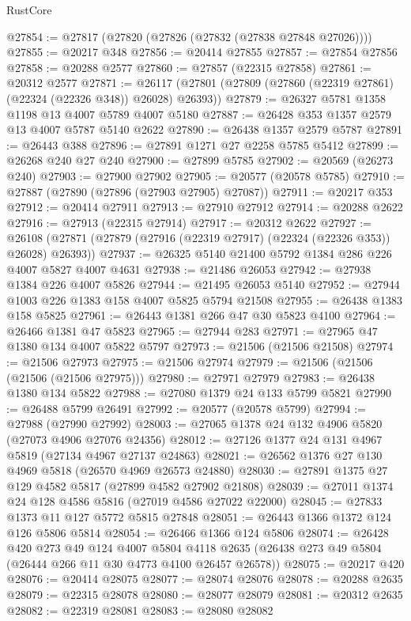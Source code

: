 \begin{lexlean}{RustCore}
\begin{coremodule}
@27854 := @27817 (@27820 (@27826 (@27832 (@27838 @27848 @27026))))
@27855 := @20217 @348
@27856 := @20414 @27855
@27857 := @27854 @27856
@27858 := @20288 @2577
@27860 := @27857 (@22315 @27858)
@27861 := @20312 @2577
@27871 := @26117 (@27801 (@27809 (@27860 (@22319 @27861) (@22324 (@22326 @348)) @26028) @26393))
@27879 := @26327 @5781 @1358 @1198 @13 @4007 @5789 @4007 @5180
@27887 := @26428 @353 @1357 @2579 @13 @4007 @5787 @5140 @2622
@27890 := @26438 @1357 @2579 @5787
@27891 := @26443 @388
@27896 := @27891 @1271 @27 @2258 @5785 @5412
@27899 := @26268 @240 @27 @240
@27900 := @27899 @5785
@27902 := @20569 (@26273 @240)
@27903 := @27900 @27902
@27905 := @20577 (@20578 @5785)
@27910 := @27887 (@27890 (@27896 (@27903 @27905) @27087))
@27911 := @20217 @353
@27912 := @20414 @27911
@27913 := @27910 @27912
@27914 := @20288 @2622
@27916 := @27913 (@22315 @27914)
@27917 := @20312 @2622
@27927 := @26108 (@27871 (@27879 (@27916 (@22319 @27917) (@22324 (@22326 @353)) @26028) @26393))
@27937 := @26325 @5140 @21400 @5792 @1384 @286 @226 @4007 @5827 @4007 @4631
@27938 := @21486 @26053
@27942 := @27938 @1384 @226 @4007 @5826
@27944 := @21495 @26053 @5140
@27952 := @27944 @1003 @226 @1383 @158 @4007 @5825 @5794 @21508
@27955 := @26438 @1383 @158 @5825
@27961 := @26443 @1381 @266 @47 @30 @5823 @4100
@27964 := @26466 @1381 @47 @5823
@27965 := @27944 @283
@27971 := @27965 @47 @1380 @134 @4007 @5822 @5797
@27973 := @21506 (@21506 @21508)
@27974 := @21506 @27973
@27975 := @21506 @27974
@27979 := @21506 (@21506 (@21506 (@21506 @27975)))
@27980 := @27971 @27979
@27983 := @26438 @1380 @134 @5822
@27988 := @27080 @1379 @24 @133 @5799 @5821
@27990 := @26488 @5799 @26491
@27992 := @20577 (@20578 @5799)
@27994 := @27988 (@27990 @27992)
@28003 := @27065 @1378 @24 @132 @4906 @5820 (@27073 @4906 @27076 @24356)
@28012 := @27126 @1377 @24 @131 @4967 @5819 (@27134 @4967 @27137 @24863)
@28021 := @26562 @1376 @27 @130 @4969 @5818 (@26570 @4969 @26573 @24880)
@28030 := @27891 @1375 @27 @129 @4582 @5817 (@27899 @4582 @27902 @21808)
@28039 := @27011 @1374 @24 @128 @4586 @5816 (@27019 @4586 @27022 @22000)
@28045 := @27833 @1373 @11 @127 @5772 @5815 @27848
@28051 := @26443 @1366 @1372 @124 @126 @5806 @5814
@28054 := @26466 @1366 @124 @5806
@28074 := @26428
    @420
    @273
    @49
    @124
    @4007
    @5804
    @4118
    @2635
    (@26438 @273 @49 @5804 (@26444 @266 @11 @30 @4773 @4100 @26457 @26578))
@28075 := @20217 @420
@28076 := @20414 @28075
@28077 := @28074 @28076
@28078 := @20288 @2635
@28079 := @22315 @28078
@28080 := @28077 @28079
@28081 := @20312 @2635
@28082 := @22319 @28081
@28083 := @28080 @28082

\end{coremodule}
\end{lexlean}
